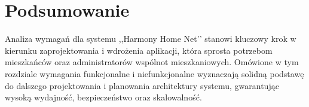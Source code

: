 \section{Podsumowanie}

Analiza wymagań dla systemu ,,Harmony Home Net’’ stanowi kluczowy krok w kierunku zaprojektowania i wdrożenia aplikacji, która sprosta potrzebom mieszkańców oraz administratorów wspólnot mieszkaniowych. Omówione w tym rozdziale wymagania funkcjonalne i niefunkcjonalne wyznaczają solidną podstawę do dalszego projektowania i planowania architektury systemu, gwarantując wysoką wydajność, bezpieczeństwo oraz skalowalność.
